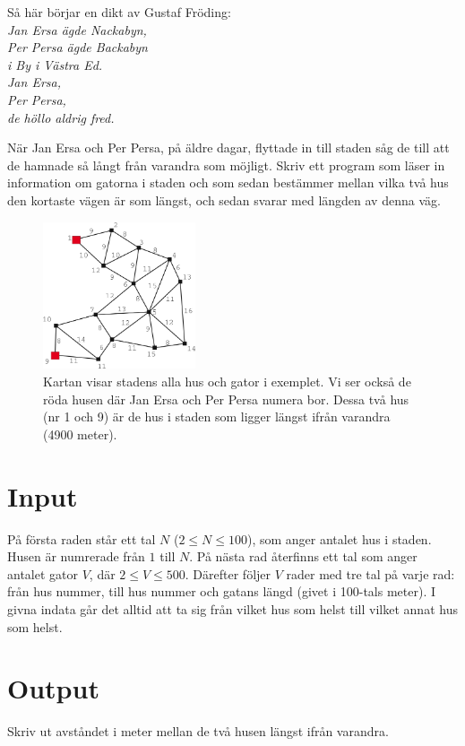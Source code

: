 Så här börjar en dikt av Gustaf Fröding:\\ 
{\em 
Jan Ersa ägde Nackabyn,\\
Per Persa ägde Backabyn \\
i By i Västra Ed. \\
Jan Ersa, \\
Per Persa, \\
de höllo aldrig fred.
}

När Jan Ersa och Per Persa, på äldre dagar, flyttade in till staden såg de till att de hamnade så långt
från varandra som möjligt. Skriv ett program som läser in information om gatorna i staden och som sedan
bestämmer mellan vilka två hus den kortaste vägen är som längst, och sedan svarar med längden av denna väg.

\begin{figure}[ht!]
\centering
\includegraphics[width=0.4\textwidth]{janersa.png}
\caption{Kartan visar stadens alla hus och gator i exemplet. Vi ser också de röda husen där Jan Ersa och Per Persa numera bor. Dessa två hus (nr 1 och 9) är de hus i staden som ligger längst ifrån varandra (4900 meter).}
\label{overflow}
\end{figure}


\section*{Input}
På första raden står ett tal $N$ ($2 \le N \le 100$), som anger antalet hus i staden. Husen är numrerade från $1$ till $N$. På nästa rad återfinns ett tal som anger antalet gator $V$, där $2 \le V \le 500$. Därefter följer $V$ rader med tre tal på varje rad: från hus nummer, till hus nummer och gatans längd (givet i 100-tals meter). I givna indata går det alltid att ta sig från vilket hus som helst till vilket annat hus som helst.

\section*{Output}
Skriv ut avståndet i meter mellan de två husen längst ifrån varandra.

